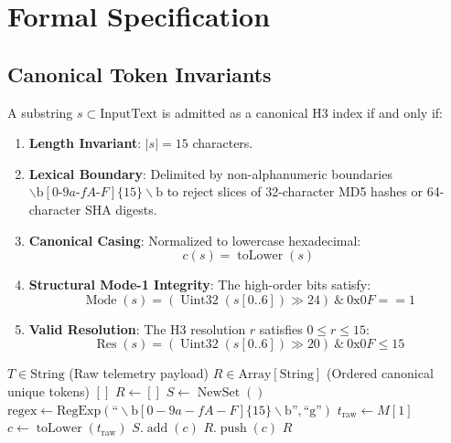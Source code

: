 \documentclass[10pt,journal,compsoc]{IEEEtran}
\begin{document}
\section{Formal Specification}

\subsection{Canonical Token Invariants}
A substring $s \subset \text{InputText}$ is admitted as a canonical H3 index if and only if:
\begin{enumerate}
    \item \textbf{Length Invariant}: $|s| = 15$ characters.
    \item \textbf{Lexical Boundary}: Delimited by non-alphanumeric boundaries $\backslash\text{b}[0\text{-}9a\text{-}fA\text{-}F]\{15\}\backslash\text{b}$ to reject slices of 32-character MD5 hashes or 64-character SHA digests.
    \item \textbf{Canonical Casing}: Normalized to lowercase hexadecimal:
    \begin{equation}
        c(s) = \operatorname{toLower}(s)
    \end{equation}
    \item \textbf{Structural Mode-1 Integrity}: The high-order bits satisfy:
    \begin{equation}
        \operatorname{Mode}(s) = (\operatorname{Uint32}(s[0..6]) \gg 24) \ \& \ 0\text{x}0F == 1
    \end{equation}
    \item \textbf{Valid Resolution}: The H3 resolution $r$ satisfies $0 \le r \le 15$:
    \begin{equation}
        \operatorname{Res}(s) = (\operatorname{Uint32}(s[0..6]) \gg 20) \ \& \ 0\text{x}0F \le 15
    \end{equation}
\end{enumerate}

\begin{algorithm}[t]
\caption{Unique Canonical H3 Token Extraction}
\label{alg:extraction}
\begin{algorithmic}[1]
\REQUIRE $T \in \text{String}$ (Raw telemetry payload)
\ENSURE $R \in \text{Array}[\text{String}]$ (Ordered canonical unique tokens)
    \RETURN $[]$
\ENDIF
\STATE $R \leftarrow []$
\STATE $S \leftarrow \operatorname{NewSet}()$
\STATE $\text{regex} \leftarrow \text{RegExp}(\text{``}\backslash\text{b}[0-9a-fA-F]\{15\}\backslash\text{b}\text{''}, \text{``g''})$
    \STATE $t_{\text{raw}} \leftarrow M[1]$
    \STATE $c \leftarrow \operatorname{toLower}(t_{\text{raw}})$
            \STATE $S.\operatorname{add}(c)$
            \STATE $R.\operatorname{push}(c)$
        \ENDIF
    \ENDIF
\ENDWHILE
\RETURN $R$
\end{algorithmic}
\end{algorithm}
\end{document}
